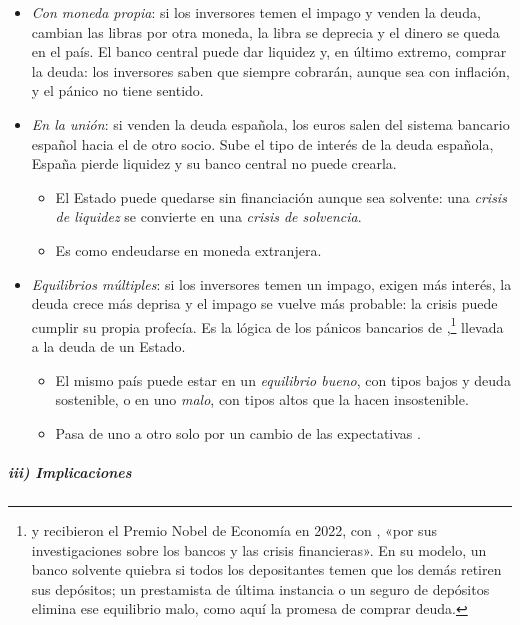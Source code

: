 \documentclass[11pt]{article}
\begin{document}
\begin{itemize}
\item \emph{Con moneda propia}: si los inversores temen el impago y venden la deuda, cambian las libras por otra moneda, la libra se deprecia y el dinero se queda en el país. El banco central puede dar liquidez y, en último extremo, comprar la deuda: los inversores saben que siempre cobrarán, aunque sea con inflación, y el pánico no tiene sentido.
\item \emph{En la unión}: si venden la deuda española, los euros salen del sistema bancario español hacia el de otro socio. Sube el tipo de interés de la deuda española, España pierde liquidez y su banco central no puede crearla.
  \begin{itemize}
  \item El Estado puede quedarse sin financiación aunque sea solvente: una \emph{crisis de liquidez} se convierte en una \emph{crisis de solvencia}.
  \item Es como endeudarse en moneda extranjera.
  \end{itemize}
\item \emph{Equilibrios múltiples}: si los inversores temen un impago, exigen más interés, la deuda crece más deprisa y el impago se vuelve más probable: la crisis puede cumplir su propia profecía\nocite{Calvo1988Servicing}. Es la lógica de los pánicos bancarios de \textcite{DiamondDybvig1983},\footnote{ y  recibieron el Premio Nobel de Economía en 2022, con , «por sus investigaciones sobre los bancos y las crisis financieras»\nocite{Nobel2022Bancos}. En su modelo, un banco solvente quiebra si todos los depositantes temen que los demás retiren sus depósitos; un prestamista de última instancia o un seguro de depósitos elimina ese equilibrio malo, como aquí la promesa de comprar deuda.} llevada a la deuda de un Estado.
  \begin{itemize}
  \item El mismo país puede estar en un \emph{equilibrio bueno}, con tipos bajos y deuda sostenible, o en uno \emph{malo}, con tipos altos que la hacen insostenible.
  \item Pasa de uno a otro solo por un cambio de las expectativas .
  \end{itemize}
\end{itemize}

\subparagraph{iii) Implicaciones}
\end{document}
